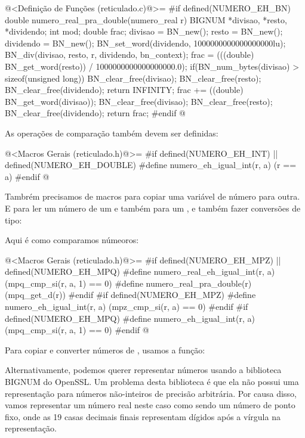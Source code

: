 \iniciocodigo
@<Definição de Funções (reticulado.c)@>=
#if defined(NUMERO_EH_BN)
double numero_real_pra_double(numero_real r){
  BIGNUM *divisao, *resto, *dividendo;
  int mod;
  double frac;
  divisao = BN_new();
  resto = BN_new();
  dividendo = BN_new();
  BN_set_word(dividendo, 1000000000000000000lu);  
  BN_div(divisao, resto, r, dividendo, bn_context);
  frac = (((double) BN_get_word(resto)) / 1000000000000000000.0);
  if(BN_num_bytes(divisao) > sizeof(unsigned long)){
    BN_clear_free(divisao);
    BN_clear_free(resto);
    BN_clear_free(dividendo);
    return INFINITY;
  }
  frac += ((double) BN_get_word(divisao));
  BN_clear_free(divisao);
  BN_clear_free(resto);
  BN_clear_free(dividendo);
  return frac;  
}
#endif
@










As operações de comparação também devem ser definidas:

\iniciocodigo
@<Macros Gerais (reticulado.h)@>=
#if defined(NUMERO_EH_INT) || defined(NUMERO_EH_DOUBLE)
#define numero_eh_igual_int(r, a) (r == a)
#endif
@
\fimcodigo


Tambrém precisamos de macros para copiar uma variável de número para
outra. E para ler um número de um  e também para
um , e também fazer conversões de tipo:






Aqui é como comparamos númeoros:

\iniciocodigo
@<Macros Gerais (reticulado.h)@>=
#if defined(NUMERO_EH_MPZ) || defined(NUMERO_EH_MPQ)
#define numero_real_eh_igual_int(r, a) (mpq_cmp_si(r, a, 1) == 0)
#define numero_real_pra_double(r) (mpq_get_d(r))
#endif
#if defined(NUMERO_EH_MPZ)
#define numero_eh_igual_int(r, a) (mpz_cmp_si(r, a) == 0)
#endif
#if defined(NUMERO_EH_MPQ)
#define numero_eh_igual_int(r, a) (mpq_cmp_si(r, a, 1) == 0)
#endif
@
\fimcodigo


Para copiar e converter números de , usamos a função:



Alternativamente, podemos querer representar números usando a
biblioteca BIGNUM do OpenSSL. Um problema desta biblioteca é que ela
não possui uma representação para números não-inteiros de precisão
arbitrária. Por causa disso, vamos representar um número real neste
caso como sendo um número de ponto fixo, onde as 19 casas decimais
finais representam dígidos após a vírgula na representação.



